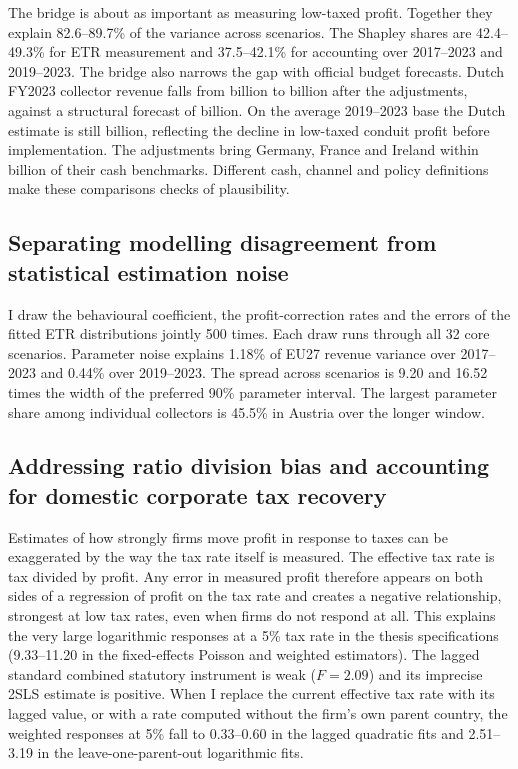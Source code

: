 \documentclass[11pt,a4paper]{article}
\newcommand{\EUR}{\texteuro}
\begin{document}
The bridge is about as important as measuring low-taxed profit. Together they explain 82.6–89.7\% of the variance across scenarios. The Shapley shares are 42.4–49.3\% for ETR measurement and 37.5–42.1\% for accounting over 2017–2023 and 2019–2023. The bridge also narrows the gap with official budget forecasts. Dutch FY2023 collector revenue falls from \EUR7.09 billion to \EUR0.45 billion after the adjustments, against a structural forecast of \EUR0.18 billion. On the average 2019–2023 base the Dutch estimate is still \EUR3.43 billion, reflecting the decline in low-taxed conduit profit before implementation. The adjustments bring Germany, France and Ireland within \EUR0.5 billion of their cash benchmarks. Different cash, channel and policy definitions make these comparisons checks of plausibility.

\subsection{Separating modelling disagreement from statistical estimation noise}

I draw the behavioural coefficient, the profit-correction rates and the errors of the fitted ETR distributions jointly 500 times. Each draw runs through all 32 core scenarios. Parameter noise explains 1.18\% of EU27 revenue variance over 2017–2023 and 0.44\% over 2019–2023. The spread across scenarios is 9.20 and 16.52 times the width of the preferred 90\% parameter interval. The largest parameter share among individual collectors is 45.5\% in Austria over the longer window.

\subsection{Addressing ratio division bias and accounting for domestic corporate tax recovery}

Estimates of how strongly firms move profit in response to taxes can be exaggerated by the way the tax rate itself is measured. The effective tax rate is tax divided by profit. Any error in measured profit therefore appears on both sides of a regression of profit on the tax rate and creates a negative relationship, strongest at low tax rates, even when firms do not respond at all. This explains the very large logarithmic responses at a 5\% tax rate in the thesis specifications (9.33–11.20 in the fixed-effects Poisson and weighted estimators). The lagged standard combined statutory instrument is weak ($F=2.09$) and its imprecise 2SLS estimate is positive. When I replace the current effective tax rate with its lagged value, or with a rate computed without the firm's own parent country, the weighted responses at 5\% fall to 0.33–0.60 in the lagged quadratic fits and 2.51–3.19 in the leave-one-parent-out logarithmic fits.
\end{document}
